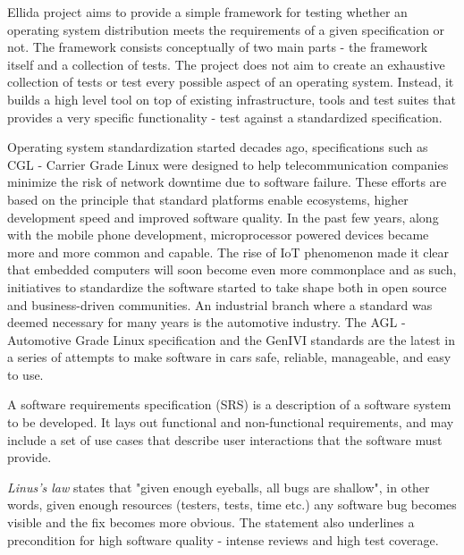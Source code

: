 \documentclass{article}
\begin{document}
	Ellida project aims to provide a simple framework for testing whether an operating system distribution meets the requirements of a given specification or not. The framework consists conceptually of two main parts - the framework itself and a collection of tests. The project does not aim to create an exhaustive collection of tests or test every possible aspect of an operating system. Instead, it builds a high level tool on top of existing infrastructure, tools and test suites that provides a very specific functionality - test against a standardized specification.

	Operating system standardization started decades ago, specifications such as CGL - Carrier Grade Linux were designed to help telecommunication companies minimize the risk of network downtime due to software failure. These efforts are based on the principle that standard platforms enable ecosystems, higher development speed and improved software quality. In the past few years, along with the mobile phone development, microprocessor powered devices became more and more common and capable. The rise of IoT phenomenon made it clear that embedded computers will soon become even more commonplace and as such, initiatives to standardize the software started to take shape both in open source and business-driven communities. An industrial branch where a standard was deemed necessary for many years is the automotive industry. The AGL - Automotive Grade Linux specification and the GenIVI standards are the latest in a series of attempts to make software in cars safe, reliable, manageable, and easy to use.

	A software requirements specification (SRS) is a description of a software system to be developed. It lays out functional and non-functional requirements, and may include a set of use cases that describe user interactions that the software must provide.

	\emph{Linus's law} states that "given enough eyeballs, all bugs are shallow", in other words, given enough resources (testers, tests, time etc.) any software bug becomes visible and the fix becomes more obvious. The statement also underlines a precondition for high software quality - intense reviews and high test coverage.
\end{document}
